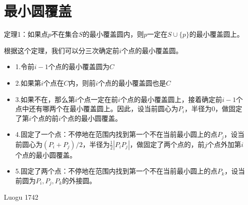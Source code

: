 \section{最小圆覆盖}
定理1：如果点$p$不在集合$S$的最小覆盖圆内，则$p$一定在$S\cup\{p\}$的最小覆盖圆上。\par
根据这个定理，我们可以分三次确定前$i$个点的最小覆盖圆。\par
\begin{itemize}
\item 1.令前$i-1$个点的最小覆盖圆为$C$
\item 2.如果第$i$个点在$C$内，则前$i$个点的最小覆盖圆也是$C$
\item 3.如果不在，那么第$i$个点一定在前$i$个点的最小覆盖圆上，接着确定前$i-1$个点中还有哪两个在最小覆盖圆上。因此，设当前圆心为$P_i$，半径为$0$，做固定了第$i$个点的前$i$个点的最小圆覆盖。
\item 4.固定了一个点：不停地在范围内找到第一个不在当前最小圆上的点$P_j$，设当前圆心为$(P_i+P_j)/2$，半径为$\frac{1}{2}|P_iP_j|$，做固定了两个点的，前$j$个点外加第$i$个点的最小圆覆盖。
\item 5.固定了两个点：不停地在范围内找到第一个不在当前最小圆上的点$P_k$，设当前圆为$P_i,P_j,P_k$的外接圆。
\end{itemize} \par
Luogu 1742\par
